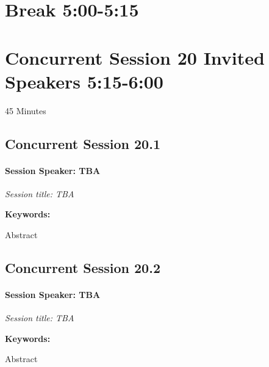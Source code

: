 \documentclass[
]{book}
\begin{document}
\hypertarget{break-500-515-1}{%
\section*{Break \textbar{} 5:00-5:15}\label{break-500-515-1}}

\hypertarget{concurrent-session-20-invited-speakers-515-600}{%
\section*{Concurrent Session 20 \textbar{} Invited Speakers \textbar{} 5:15-6:00}\label{concurrent-session-20-invited-speakers-515-600}}

45 Minutes

\hypertarget{concurrent-session-20.1}{%
\subsection*{Concurrent Session 20.1}\label{concurrent-session-20.1}}

\begin{speaker}
\hypertarget{session-speaker-tba}{%
\paragraph{\texorpdfstring{Session Speaker:
\textbf{TBA}}{Session Speaker: TBA}}\label{session-speaker-tba}}

\emph{Session title: TBA}

\textbf{Keywords:}

Abstract
\end{speaker}

\hypertarget{concurrent-session-20.2}{%
\subsection*{Concurrent Session 20.2}\label{concurrent-session-20.2}}

\begin{speaker}
\hypertarget{session-speaker-tba}{%
\paragraph{\texorpdfstring{Session Speaker:
\textbf{TBA}}{Session Speaker: TBA}}\label{session-speaker-tba}}

\emph{Session title: TBA}

\textbf{Keywords:}

Abstract
\end{speaker}
\end{document}
